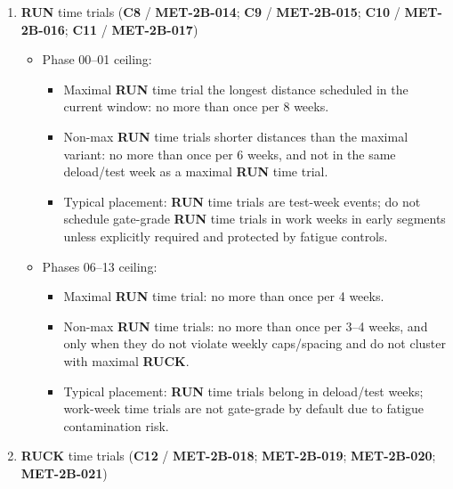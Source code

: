 \documentclass[10pt]{article}
\begin{document}
\begin{enumerate}
\item \textbf{RUN} time trials (\textbf{C8} / \textbf{MET-2B-014}; \textbf{C9} / \textbf{MET-2B-015}; \textbf{C10} / \textbf{MET-2B-016}; \textbf{C11} / \textbf{MET-2B-017})

\begin{itemize}
\item Phase 00–01 ceiling:
  \begin{itemize}
  \item Maximal \textbf{RUN} time trial the longest distance scheduled in the current window: no more than once per 8 weeks.
  \item Non-max \textbf{RUN} time trials shorter distances than the maximal variant: no more than once per 6 weeks, and not in the same deload/test week as a maximal \textbf{RUN} time trial.
  \item Typical placement: \textbf{RUN} time trials are test-week events; do not schedule gate-grade \textbf{RUN} time trials in work weeks in early segments unless explicitly required and protected by fatigue controls.
  \end{itemize}
\item Phases 06–13 ceiling:
  \begin{itemize}
  \item Maximal \textbf{RUN} time trial: no more than once per 4 weeks.
  \item Non-max \textbf{RUN} time trials: no more than once per 3–4 weeks, and only when they do not violate weekly caps/spacing and do not cluster with maximal \textbf{RUCK}.
  \item Typical placement: \textbf{RUN} time trials belong in deload/test weeks; work-week time trials are not gate-grade by default due to fatigue contamination risk.
  \end{itemize}
\end{itemize}

\item \textbf{RUCK} time trials (\textbf{C12} / \textbf{MET-2B-018}; \textbf{MET-2B-019}; \textbf{MET-2B-020}; \textbf{MET-2B-021})


\end{enumerate}
\end{document}

